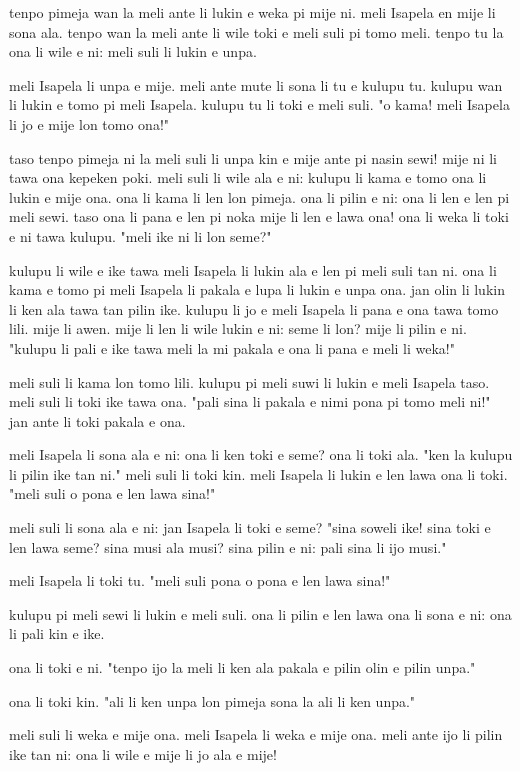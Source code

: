 tenpo pimeja wan la meli ante li lukin e weka pi mije ni.
meli Isapela en mije li sona ala.
tenpo wan la meli ante li wile toki e meli suli pi tomo meli.
tenpo tu la ona li wile e ni: meli suli li lukin e unpa.

meli Isapela li unpa e mije.
meli ante mute li sona li tu e kulupu tu.
kulupu wan li lukin e tomo pi meli Isapela.
kulupu tu li toki e meli suli.
"o kama!
meli Isapela li jo e mije lon tomo ona!"

taso tenpo pimeja ni la meli suli li unpa kin e mije ante pi nasin sewi!
mije ni li tawa ona kepeken poki.
meli suli li wile ala e ni: kulupu li kama e tomo ona li lukin e mije ona.
ona li kama li len lon pimeja.
ona li pilin e ni: ona li len e len pi meli sewi.
taso ona li pana e len pi noka mije li len e lawa ona!
ona li weka li toki e ni tawa kulupu.
"meli ike ni li lon seme?"

kulupu li wile e ike tawa meli Isapela li lukin ala e len pi meli suli tan ni.
ona li kama e tomo pi meli Isapela li pakala e lupa li lukin e unpa ona.
jan olin li lukin li ken ala tawa tan pilin ike.
kulupu li jo e meli Isapela li pana e ona tawa tomo lili.
mije li awen.
mije li len li wile lukin e ni: seme li lon?
mije li pilin e ni.
"kulupu li pali e ike tawa meli la mi pakala e ona li pana e meli li weka!"

meli suli li kama lon tomo lili.
kulupu pi meli suwi li lukin e meli Isapela taso.
meli suli li toki ike tawa ona.
"pali sina li pakala e nimi pona pi tomo meli ni!"
jan ante li toki pakala e ona.

meli Isapela li sona ala e ni: ona li ken toki e seme?
ona li toki ala.
"ken la kulupu li pilin ike tan ni."
meli suli li toki kin.
meli Isapela li lukin e len lawa ona li toki.
"meli suli o pona e len lawa sina!"

meli suli li sona ala e ni: jan Isapela li toki e seme?
"sina soweli ike!
sina toki e len lawa seme?
sina musi ala musi?
sina pilin e ni: pali sina li ijo musi."

meli Isapela li toki tu.
"meli suli pona o pona e len lawa sina!"

kulupu pi meli sewi li lukin e meli suli.
ona li pilin e len lawa ona li sona e ni: ona li pali kin e ike.

ona li toki e ni.
"tenpo ijo la meli li ken ala pakala e pilin olin e pilin unpa."

ona li toki kin.
"ali li ken unpa lon pimeja sona la ali li ken unpa."

meli suli li weka e mije ona.
meli Isapela li weka e mije ona.
meli ante ijo li pilin ike tan ni: ona li wile e mije li jo ala e mije!

